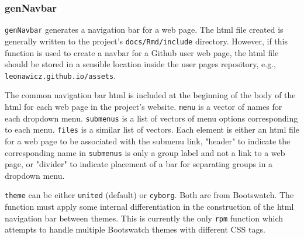 \documentclass{article}\usepackage[]{graphicx}\usepackage[]{color}
\begin{document}
\title{}
\author{}
\maketitle





\subsubsection{genNavbar}

\texttt{genNavbar} generates a navigation bar for a web page.
The html file created is generally written to the project's \texttt{docs/Rmd/include} directory.
However, if this function is used to create a navbar for a Github user web page, the html file should be stored in a sensible location inside the user pages repository, e.g., \texttt{leonawicz.github.io/assets}.

The common navigation bar html is included at the beginning of the body of the html for each web page in the project's website.
\texttt{menu} is a vector of names for each dropdown menu.
\texttt{submenus} is a list of vectors of menu options corresponding to each menu.
\texttt{files} is a similar list of vectors.
Each element is either an html file for a web page to be associated with the submenu link,
"header" to indicate the corresponding name in \texttt{submenus} is only a group label and not a link to a web page,
or "divider" to indicate placement of a bar for separating groups in a dropdown menu.

\texttt{theme} can be either \texttt{united} (default) or \texttt{cyborg}.
Both are from Bootswatch.
The function must apply some internal differentiation in the construction of the html navigation bar between themes.
This is currently the only \texttt{rpm} function which attempts to handle multiple Bootswatch themes with different CSS tags.
\end{document}
